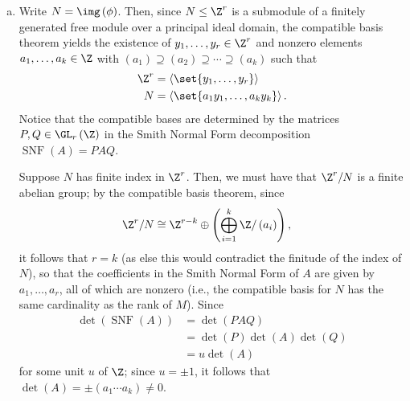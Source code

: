 \documentclass[10pt]{mypackage}
\begin{document}
\begin{solution}\hfill
  \begin{enumerate}[(a)]
    \item Write $N = \img\left( \phi \right)$. Then, since $N\leq \Z^r$ is a submodule of a finitely generated free module over a principal ideal domain, the compatible basis theorem yields the existence of $y_1,\dots,y_r\in \Z^{r}$ and nonzero elements $a_1,\dots,a_k\in \Z$ with $\left( a_1 \right)\supseteq \left( a_2 \right)\supseteq\cdots\supseteq \left( a_k \right)$ such that
      \begin{align*}
        \Z^{r} &= \left\langle \set{y_1,\dots,y_r} \right\rangle\\
        N &= \left\langle \set{a_1y_1,\dots,a_ky_k} \right\rangle.
      \end{align*}
      Notice that the compatible bases are determined by the matrices $P,Q\in \GL_r\left( \Z \right)$ in the Smith Normal Form decomposition $\operatorname{SNF}\left( A \right) = PAQ$.

      Suppose $N$ has finite index in $\Z^{r}$. Then, we must have that $\Z^{r}/N$ is a finite abelian group; by the compatible basis theorem, since
      \begin{align*}
        \Z^{r}/N &\cong \Z^{r-k} \oplus \left( \bigoplus_{i=1}^{k} \Z/\left( a_i \right) \right),
      \end{align*}
      it follows that $r = k$ (as else this would contradict the finitude of the index of $N$), so that the coefficients in the Smith Normal Form of $A$ are given by $a_1,\dots,a_r$, all of which are nonzero (i.e., the compatible basis for $N$ has the same cardinality as the rank of $M$). Since
      \begin{align*}
        \det\left( \operatorname{SNF}\left( A \right) \right) &= \det\left( PAQ \right)\\
                                                              &= \det\left( P \right)\det\left( A \right)\det\left( Q \right)\\
                                                              &= u \det\left( A \right)
      \end{align*}
      for some unit $u$ of $\Z$; since $u = \pm 1$, it follows that $\det\left( A \right) = \pm \left( a_1\cdots a_k \right)\neq 0$.


\end{enumerate}
\end{solution}
\end{document}
